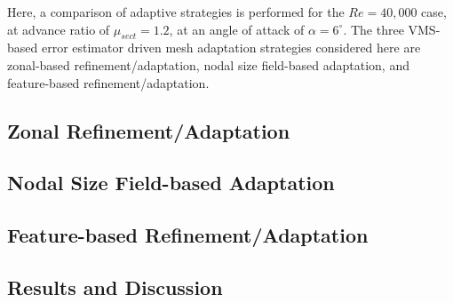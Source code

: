 Here, a comparison of adaptive strategies is performed for the $Re=40,000$ case, at advance ratio of $\mu_{sect}=1.2$, at an angle of attack of $\alpha=6^\circ$.
The three VMS-based error estimator driven mesh adaptation strategies considered here are zonal-based refinement/adaptation, nodal size field-based adaptation, and feature-based refinement/adaptation.

\subsection{Zonal Refinement/Adaptation}


\subsection{Nodal Size Field-based Adaptation}


\subsection{Feature-based Refinement/Adaptation}

\label{sec:feature_based_strat}


\subsection{Results and Discussion}

\label{sec:results_adapt}
